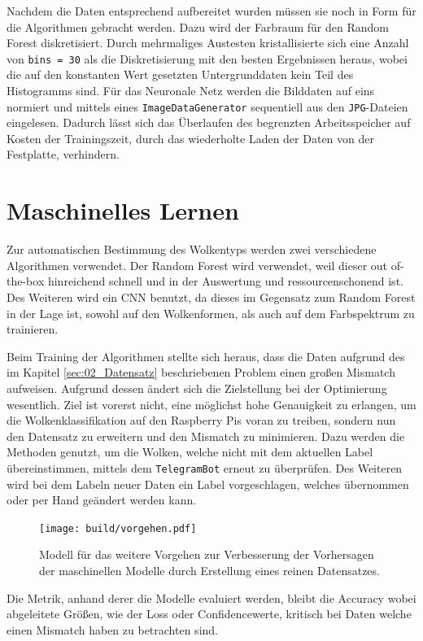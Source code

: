 Nachdem die Daten entsprechend aufbereitet wurden müssen sie noch in Form für
die Algorithmen gebracht werden. 
Dazu wird der Farbraum für den Random Forest diskretisiert.
Durch mehrmaliges Austesten kristallisierte sich eine Anzahl von 
\texttt{bins = 30} als die Diskretisierung mit den besten Ergebnissen heraus,
wobei die auf den konstanten Wert gesetzten Untergrunddaten kein Teil des
Histogramms sind.
Für das Neuronale Netz werden die Bilddaten auf eins normiert und mittels 
eines \texttt{ImageDataGenerator} sequentiell aus den \texttt{JPG}-Dateien 
eingelesen. 
Dadurch lässt sich das Überlaufen des begrenzten Arbeitsspeicher auf Kosten 
der Trainingszeit, durch das wiederholte Laden der Daten von der Festplatte,
verhindern.


\section{Maschinelles Lernen}

Zur automatischen Bestimmung des Wolkentyps werden zwei verschiedene 
Algorithmen verwendet. 
Der Random Forest wird verwendet, weil dieser out of-the-box hinreichend 
schnell und in der Auswertung und ressourcenschonend ist.
Des Weiteren wird ein CNN benutzt, da dieses im Gegensatz zum Random Forest in 
der Lage ist, sowohl auf den Wolkenformen, als auch auf dem 
Farbspektrum zu trainieren. 

Beim Training der Algorithmen stellte sich heraus, dass die Daten aufgrund des im
Kapitel \ref{sec:02_Datensatz} beschriebenen Problem einen großen Mismatch 
aufweisen. 
Aufgrund dessen ändert sich die Zielstellung bei der Optimierung wesentlich.
Ziel ist vorerst nicht, eine möglichst hohe Genauigkeit zu erlangen,
um die Wolkenklassifikation auf den Raspberry Pis voran zu treiben,
sondern nun den Datensatz zu erweitern und den Mismatch zu 
minimieren.
Dazu werden die Methoden genutzt, um die Wolken, welche nicht mit dem 
aktuellen Label übereinstimmen, mittels dem \texttt{TelegramBot} erneut zu überprüfen.
Des Weiteren wird bei dem Labeln neuer Daten ein Label vorgeschlagen,
welches übernommen oder per Hand geändert werden kann.
\begin{figure}
		\centering
		\texttt{[image: build/vorgehen.pdf]}
		\caption{Modell für das weitere Vorgehen zur Verbesserung der Vorhersagen
		der maschinellen Modelle durch Erstellung eines reinen Datensatzes.}
		\label{fig:}
\end{figure}

Die Metrik, anhand derer die Modelle evaluiert werden, bleibt die 
Accuracy wobei abgeleitete Größen, wie der Loss oder Confidencewerte, kritisch bei Daten welche einen Mismatch haben zu 
betrachten sind.

